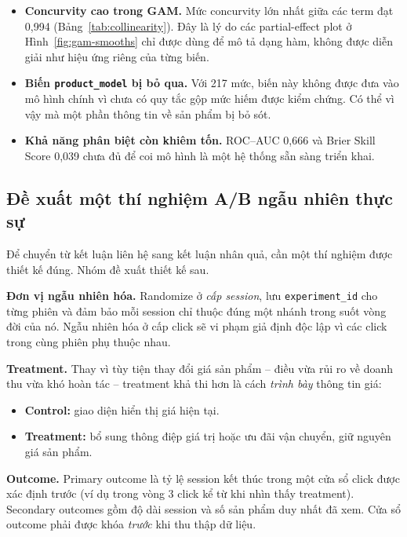 \begin{itemize}
  \item \textbf{Concurvity cao trong GAM.} Mức concurvity lớn nhất giữa các term
  đạt 0,994 (Bảng~\ref{tab:collinearity}). Đây là lý do các partial-effect plot ở
  Hình~\ref{fig:gam-smooths} chỉ được dùng để mô tả dạng hàm, không được diễn
  giải như hiệu ứng riêng của từng biến.

  \item \textbf{Biến \texttt{product\_model} bị bỏ qua.} Với 217 mức, biến này
  không được đưa vào mô hình chính vì chưa có quy tắc gộp mức hiếm được kiểm
  chứng. Có thể vì vậy mà một phần thông tin về sản phẩm bị bỏ sót.

  \item \textbf{Khả năng phân biệt còn khiêm tốn.} ROC--AUC 0,666 và Brier Skill
  Score 0,039 chưa đủ để coi mô hình là một hệ thống sẵn sàng triển khai.
\end{itemize}

\subsection{Đề xuất một thí nghiệm A/B ngẫu nhiên thực sự}
\label{subsec:future-ab}

Để chuyển từ kết luận liên hệ sang kết luận nhân quả, cần một thí nghiệm được
thiết kế đúng. Nhóm đề xuất thiết kế sau.

\textbf{Đơn vị ngẫu nhiên hóa.} Randomize ở \emph{cấp session}, lưu
\texttt{experiment\_id} cho từng phiên và đảm bảo mỗi session chỉ thuộc đúng một
nhánh trong suốt vòng đời của nó. Ngẫu nhiên hóa ở cấp click sẽ vi phạm giả định
độc lập vì các click trong cùng phiên phụ thuộc nhau.

\textbf{Treatment.} Thay vì tùy tiện thay đổi giá sản phẩm -- điều vừa rủi ro về
doanh thu vừa khó hoàn tác -- treatment khả thi hơn là cách \emph{trình bày}
thông tin giá:

\begin{itemize}
  \item \textbf{Control:} giao diện hiển thị giá hiện tại.
  \item \textbf{Treatment:} bổ sung thông điệp giá trị hoặc ưu đãi vận chuyển,
  giữ nguyên giá sản phẩm.
\end{itemize}

\textbf{Outcome.} Primary outcome là tỷ lệ session kết thúc trong một cửa sổ
click được xác định trước (ví dụ trong vòng 3 click kể từ khi nhìn thấy
treatment). Secondary outcomes gồm độ dài session và số sản phẩm duy nhất đã xem.
Cửa sổ outcome phải được khóa \emph{trước} khi thu thập dữ liệu.

